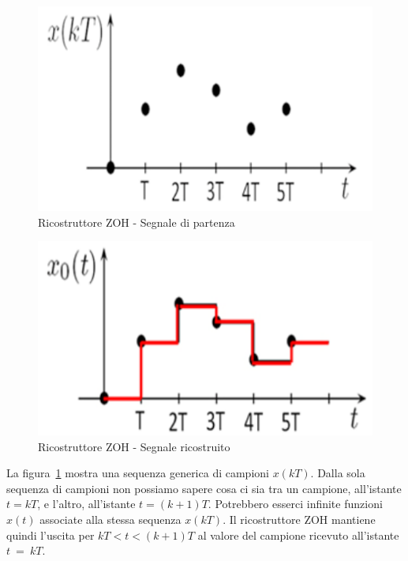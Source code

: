 \documentclass[a4paper]{report}
\begin{document}
\begin{figure}[!h]
  \begin{center}
    \includegraphics[scale=0.3]{./figures/zoh00.png}
    \caption{Ricostruttore ZOH - Segnale di partenza}\label{fig:zoh00}
  \end{center}
\end{figure}
\begin{figure}[!h]
  \begin{center}
    \includegraphics[scale=0.3]{./figures/zoh01.png}
    \caption{Ricostruttore ZOH - Segnale ricostruito}\label{fig:zoh01}
  \end{center}
\end{figure}

La figura~\ref{fig:zoh00} mostra una sequenza generica di campioni
$x(kT)$. Dalla sola sequenza di campioni non possiamo sapere cosa ci
sia tra un campione, all'istante $t = kT$, e l'altro, all'istante $t =
(k + 1)T$. Potrebbero esserci infinite funzioni $x(t)$ associate alla
stessa sequenza $x(kT)$. Il ricostruttore ZOH mantiene quindi l'uscita
per $kT < t < (k + 1)T$ al valore del campione ricevuto all'istante
$t~=~kT$. 
\end{document}
